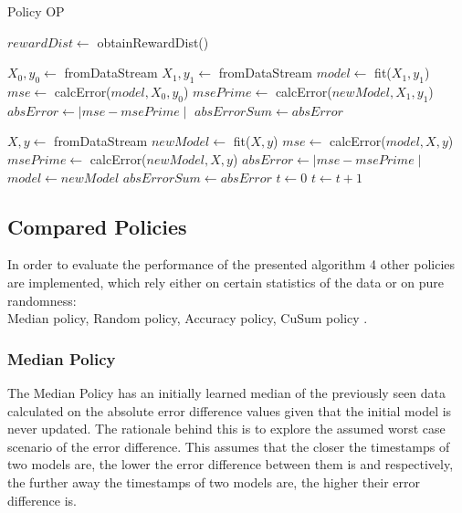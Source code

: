 \documentclass{mpaper}
\begin{document}
\begin{algorithm}
\caption{Policy OP}\label{polOP}
\begin{algorithmic}
\State $rewardDist \gets$ obtainRewardDist() 

\State $X_0, y_0 \gets$ fromDataStream
\State $X_1, y_1 \gets$ fromDataStream
\State $model \gets$ fit($X_1, y_1$)
\State $mse \gets$ calcError($model,X_0,y_0$)
\State $msePrime \gets$ calcError($newModel,X_1,y_1$)
\State $absError \gets \mid mse - msePrime \mid$
\State $absErrorSum \gets absError$

    \State $X, y \gets$ fromDataStream
    \State $newModel \gets$ fit($X,y$)
    \State $mse \gets$ calcError($model,X,y$)
    \State $msePrime \gets$ calcError($newModel,X,y$)
    \State $absError \gets \mid mse - msePrime \mid$
        \State $model \gets newModel$ 
        \State $absErrorSum \gets absError$
        \State $t \gets 0$
    \EndIf
    \State $t \gets t + 1$
\EndWhile
\end{algorithmic}
\end{algorithm}

\subsection{Compared Policies}

In order to evaluate the performance of the presented algorithm 4 other policies are implemented, which rely either on certain statistics of the data or on pure randomness:\\
Median policy, Random policy, Accuracy policy, CuSum policy \cite{cusum_pierre}.

\subsubsection{Median Policy}

The Median Policy has an initially learned median of the previously seen data calculated on the absolute error difference values given that the initial model is never updated. 
The rationale behind this is to explore the assumed worst case scenario of the error difference. This assumes that the closer the timestamps of two models are, the lower the error difference between them is and respectively, the further away the timestamps of two models are, the higher their error difference is.
\end{document}
